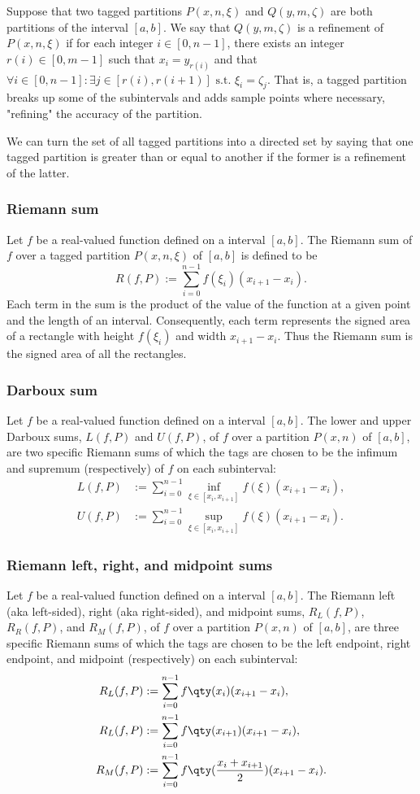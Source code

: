 Suppose that two tagged partitions $P(x,n,\xi)$ and $Q(y,m,\zeta)$ are both partitions of the interval $[a,b]$. We say that $Q(y,m,\zeta)$ is a refinement of $P(x,n,\xi)$ if for each integer $i\in [0,n-1]$, there exists an integer $r(i)\in [0,m-1]$ such that $x_i = y_{r(i)}$ and that $\forall i\in [0,n-1]\colon\exists j\in [r(i),r(i + 1)] \text{\ s.t.\ }\xi_i = \zeta_j$. That is, a tagged partition breaks up some of the subintervals and adds sample points where necessary, "refining" the accuracy of the partition.

We can turn the set of all tagged partitions into a directed set by saying that one tagged partition is greater than or equal to another if the former is a refinement of the latter.
\subsubsection{Riemann sum}
Let $f$ be a real-valued function defined on a interval $[a,b]$. The Riemann sum of $f$ over a tagged partition $P(x,n,\xi)$ of $[a,b]$ is defined to be
\[R(f,P):=\sum_{i=0}^{n-1}f(\xi_i)\left(x_{i+1}-x_i\right).\]
Each term in the sum is the product of the value of the function at a given point and the length of an interval. Consequently, each term represents the signed area of a rectangle with height $f(\xi_i)$ and width $x_{i + 1} − x_i$. Thus the Riemann sum is the signed area of all the rectangles.
\subsubsection{Darboux sum}
Let $f$ be a real-valued function defined on a interval $[a,b]$. The lower and upper Darboux sums, $L(f,P)$ and $U(f,P)$, of $f$ over a partition $P(x,n)$ of $[a,b]$, are two specific Riemann sums of which the tags are chosen to be the infimum and supremum (respectively) of $f$ on each subinterval:
\[\begin{aligned}
L(f,P)&:=\sum_{i=0}^{n-1}\inf_{\xi\in [x_i,x_{i+1}]}f(\xi)(x_{i+1}-x_i),\\
U(f,P)&:=\sum_{i=0}^{n-1}\sup_{\xi\in [x_i,x_{i+1}]}f(\xi)(x_{i+1}-x_i).
\end{aligned}\]
\subsubsection{Riemann left, right, and midpoint sums}
Let $f$ be a real-valued function defined on a interval $[a,b]$. The Riemann left (aka left-sided), right (aka right-sided), and midpoint sums, $R_L(f,P)$, $R_R(f,P)$, and $R_M(f,P)$, of $f$ over a partition $P(x,n)$ of $[a,b]$, are three specific Riemann sums of which the tags are chosen to be the left endpoint, right endpoint, and midpoint (respectively) on each subinterval:
\[\begin{aligned}
R_L(f,P)&:=\sum_{i=0}^{n-1}f\qty(x_i)(x_{i+1}-x_i),\\
R_L(f,P)&:=\sum_{i=0}^{n-1}f\qty(x_{i+1})(x_{i+1}-x_i),\\
R_M(f,P)&:=\sum_{i=0}^{n-1}f\qty(\frac{x_i+x_{i+1}}{2})(x_{i+1}-x_i).
\end{aligned}\]
